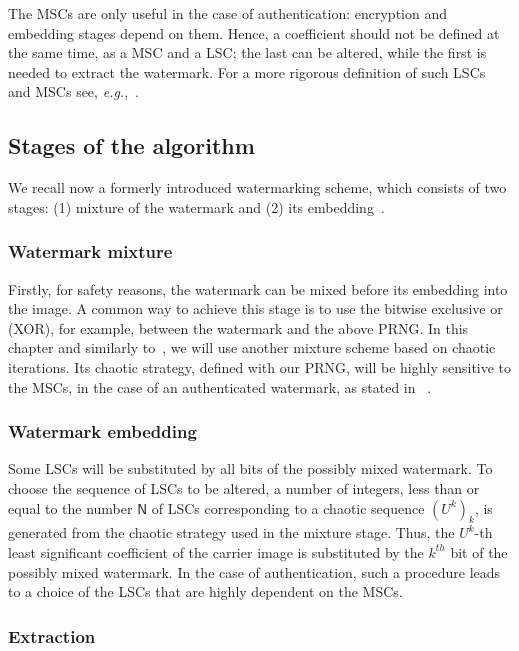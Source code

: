 The MSCs are only useful in the case of authentication: encryption and embedding stages depend on them. 
Hence, a coefficient should not be defined at the same time, as a MSC and a LSC; 
the last can be altered, while the first is needed to extract the watermark.
For a more rigorous definition of such LSCs 
and MSCs see, \emph{e.g.},~\cite{bcg11:ij}.


\subsection{Stages of the algorithm}

We recall now a formerly introduced
 watermarking scheme, which consists of two stages: (1) mixture of the watermark and (2) its embedding~\cite{bg10b:ip}.

\subsubsection{Watermark mixture}

Firstly, for safety reasons, the watermark can be mixed before its embedding into the image. A common 
way to achieve this stage is to use the bitwise exclusive or (XOR), for example, between the watermark 
and the above PRNG. In this chapter and similarly
to~\cite{bg10b:ip}, we will use another mixture scheme based on chaotic iterations. 
Its chaotic strategy, defined with our PRNG, will be highly sensitive to the MSCs, in the case of an 
authenticated watermark, as stated in ~\cite{guyeux10}.

\subsubsection{Watermark embedding}

Some LSCs will be substituted by all bits of the possibly mixed watermark. 
To choose the sequence of LSCs to be altered, a number of integers, less than or equal to the 
number $\mathsf{N}$ of LSCs corresponding to a chaotic sequence $\left( U^{k}\right) _{k}$, 
is generated from the chaotic strategy used in the mixture stage. Thus, the $U^{k}$-th least 
significant coefficient of the carrier image is substituted by the $k^{th}$ bit of the possibly 
mixed watermark. In the case of authentication, such a procedure leads to a choice of the LSCs 
that are highly dependent on the MSCs.

\subsubsection{Extraction}


